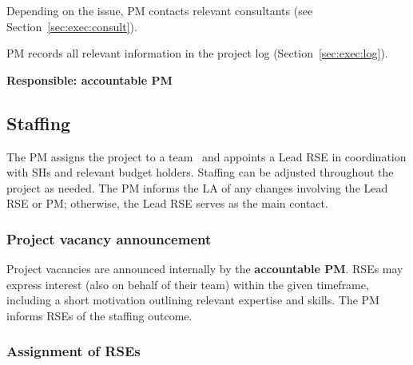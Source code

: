 Depending on the issue, PM contacts relevant consultants (see Section~\ref{sec:exec:consult}).

PM records all relevant information in the project log (Section~\ref{sec:exec:log}).

\textbf{Responsible: accountable PM}

\subsection{Staffing}
\label{sec:init:vacancy}
The PM assigns the project to a team~\cite{rse-teams} and appoints a Lead RSE in coordination with SHs and relevant budget 
holders. Staffing can be adjusted throughout the project as needed. The PM informs the LA of any changes involving 
the Lead RSE or PM; otherwise, the Lead RSE serves as the main contact.


\subsubsection{Project vacancy announcement}

Project vacancies are announced internally by the \textbf{accountable PM}. RSEs may express interest (also on behalf of their team) 
within the given timeframe, including a short motivation outlining relevant expertise and skills. The PM informs RSEs of the staffing outcome.

\subsubsection{Assignment of RSEs}
%

